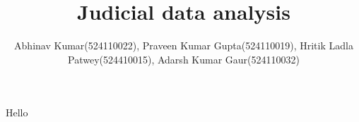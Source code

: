\documentclass{report}
\title{\Large{Judicial data analysis}}
\author{Abhinav Kumar(524110022), Praveen Kumar Gupta(524110019), Hritik Ladla Patwey(524410015), Adarsh Kumar Gaur(524110032)}
\begin{document}
\maketitle
Hello
\end{document}
